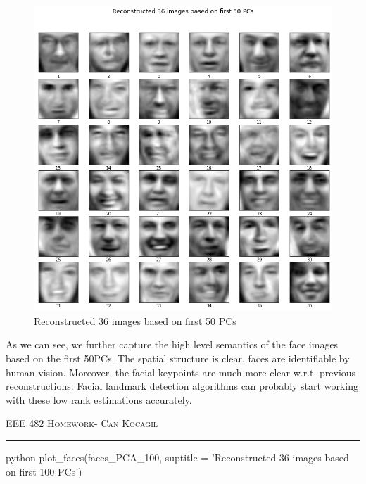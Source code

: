 \documentclass[12pt]{amsart}
\begin{document}
\begin{figure}[h]
    \centering
        \includegraphics[width = 1\textwidth]{images/Q1/Reconstructed 36 images based on first 50 PCs.png}
        \caption{Reconstructed 36 images based on first 50 PCs}
\end{figure}

As we can see, we further capture the high level semantics of the face images based on the first 50PCs. The spatial structure is clear, faces are identifiable by human vision. Moreover, the facial keypoints are much more clear w.r.t. previous reconstructions. Facial landmark detection algorithms can probably start working with these low rank estimations accurately.


\newpage
{\scshape EEE 482} \hfill {\scshape \large  Homework-\relax} \hfill {\scshape Can Kocagil}
\smallskip
\hrule
\vspace{2mm}

\begin{mintedbox}{python}
plot_faces(faces_PCA_100, suptitle = 'Reconstructed 36 images based on first 100 PCs')
\end{mintedbox}
\end{document}
